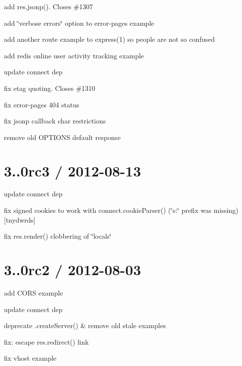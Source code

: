 {\ttfamily }

{\ttfamily 
\begin{DoxyItemize}
\item add {\ttfamily res.\+jsonp()}. Closes \#1307
\item add \char`\"{}verbose errors\char`\"{} option to error-\/pages example
\item add another route example to express(1) so people are not so confused
\item add redis online user activity tracking example
\item update connect dep
\item fix etag quoting. Closes \#1310
\item fix error-\/pages 404 status
\item fix jsonp callback char restrictions
\item remove old O\+P\+T\+I\+O\+NS default response
\end{DoxyItemize}}

{\ttfamily \section*{3..\+0rc3 / 2012-\/08-\/13 }}

{\ttfamily }

{\ttfamily 
\begin{DoxyItemize}
\item update connect dep
\item fix signed cookies to work with {\ttfamily connect.\+cookie\+Parser()} (\char`\"{}s\+:\char`\"{} prefix was missing) \mbox{[}tnydwrds\mbox{]}
\item fix {\ttfamily res.\+render()} clobbering of \char`\"{}locals\char`\"{}
\end{DoxyItemize}}

{\ttfamily \section*{3..\+0rc2 / 2012-\/08-\/03 }}

{\ttfamily }

{\ttfamily 
\begin{DoxyItemize}
\item add C\+O\+RS example
\item update connect dep
\item deprecate {\ttfamily .create\+Server()} \& remove old stale examples
\item fix\+: escape {\ttfamily res.\+redirect()} link
\item fix vhost example
\end{DoxyItemize}}

